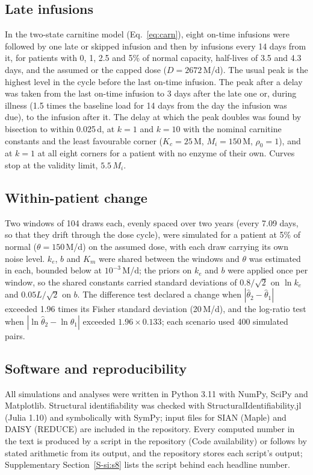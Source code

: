 \documentclass[11pt]{article}
\newcommand{\um}{\,\textmu M/d}
\begin{document}
\subsection*{Late infusions}\label{sec:late}
In the two-state carnitine model (Eq.~\eqref{eq:carn}), eight on-time infusions were followed by
one late or skipped infusion and then by infusions every 14 days from it, for patients with 0, 1,
2.5 and 5\% of normal capacity, half-lives of 3.5 and 4.3 days, and the assumed or the capped dose
($D=2672$\um). The usual peak is the highest level in the cycle before the last on-time infusion.
The peak after a delay was taken from the last on-time infusion to 3 days after the late one or,
during illness (1.5 times the baseline load for 14 days from the day the infusion was due), to the
infusion after it. The delay at which the peak doubles was found by bisection to within 0.025\,d,
at $k=1$ and $k=10$ with the nominal carnitine constants and the least favourable corner
($K_c=25$\,\textmu M, $M_i=150$\,\textmu M, $\rho_0=1$), and at $k=1$ at all eight corners for a
patient with no enzyme of their own. Curves stop at the validity limit, $5.5\,M_i$.

\subsection*{Within-patient change}\label{sec:change}
Two windows of 104 draws each, evenly spaced over two years (every 7.09 days, so that they drift
through the dose cycle), were simulated for a patient at 5\% of normal ($\theta=150$\um) on the
assumed dose, with each draw carrying its own noise level. $k_e$, $b$ and $K_m$ were shared between
the windows and $\theta$ was estimated in each, bounded below at $10^{-3}$\um; the priors on $k_e$
and $b$ were applied once per window, so the shared constants carried standard deviations of
$0.8/\sqrt2$ on $\ln k_e$ and $0.05L/\sqrt2$ on $b$. The difference test declared a change when
$|\hat\theta_2-\hat\theta_1|$ exceeded 1.96 times its Fisher standard deviation (20\um), and the
log-ratio test when $|\ln\hat\theta_2-\ln\hat\theta_1|$ exceeded $1.96\times0.133$; each scenario
used 400 simulated pairs.

\subsection*{Software and reproducibility}\label{sec:software}
All simulations and analyses were written in Python 3.11 with NumPy, SciPy and Matplotlib.
Structural identifiability was checked with StructuralIdentifiability.jl (Julia 1.10) and symbolically
with SymPy; input files for SIAN (Maple) and DAISY (REDUCE) are included in the repository. Every computed number in the text is produced by a script in the repository (Code availability) or follows by stated arithmetic from its output, and the repository stores each script's output; Supplementary
Section~\ref{S-si:s8} lists the script behind each headline number.
\end{document}
